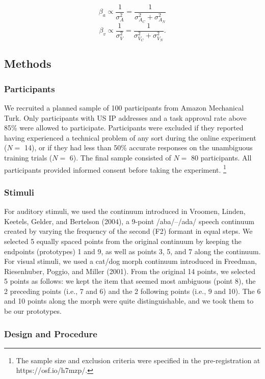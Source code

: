 \documentclass[english,,man,floatsintext]{apa6}
\let\rmarkdownfootnote\footnote%
\def\footnote{\protect\rmarkdownfootnote}
\theoremstyle{definition}
\theoremstyle{definition}
\theoremstyle{definition}
\theoremstyle{remark}
\begin{document}
\[\beta_a \propto \frac{1}{\sigma^2_{A}} = \frac{1}{\sigma^2_{A_C} + \sigma^2_{A_N}}\]
\[\beta_v \propto \frac{1}{\sigma^2_{V}} = \frac{1}{\sigma^2_{V_C} + \sigma^2_{V_N}}.\]

\subsection{Methods}\label{methods}

\subsubsection{Participants}\label{participants}

We recruited a planned sample of 100 participants from Amazon Mechanical
Turk. Only participants with US IP addresses and a task approval rate
above 85\% were allowed to participate. Participants were excluded if
they reported having experienced a technical problem of any sort during
the online experiment (\(N =\) 14), or if they had less than 50\%
accurate responses on the unambiguous training trials (\(N =\) 6). The
final sample consisted of \(N =\) 80 participants. All participants
provided informed consent before taking the experiment.
\footnote{The sample size and exclusion criteria were specified in the pre-registration at https://osf.io/h7mzp/.}

\subsubsection{Stimuli}\label{stimuli}

For auditory stimuli, we used the continuum introduced in Vroomen,
Linden, Keetels, Gelder, and Bertelson (2004), a 9-point /aba/--/ada/
speech continuum created by varying the frequency of the second (F2)
formant in equal steps. We selected 5 equally spaced points from the
original continuum by keeping the endpoints (prototypes) 1 and 9, as
well as points 3, 5, and 7 along the continuum. For visual stimuli, we
used a cat/dog morph continuum introduced in Freedman, Riesenhuber,
Poggio, and Miller (2001). From the original 14 points, we selected 5
points as follows: we kept the item that seemed most ambiguous (point
8), the 2 preceding points (i.e., 7 and 6) and the 2 following points
(i.e., 9 and 10). The 6 and 10 points along the morph were quite
distinguishable, and we took them to be our prototypes.

\subsubsection{Design and Procedure}\label{design-and-procedure}
\end{document}
